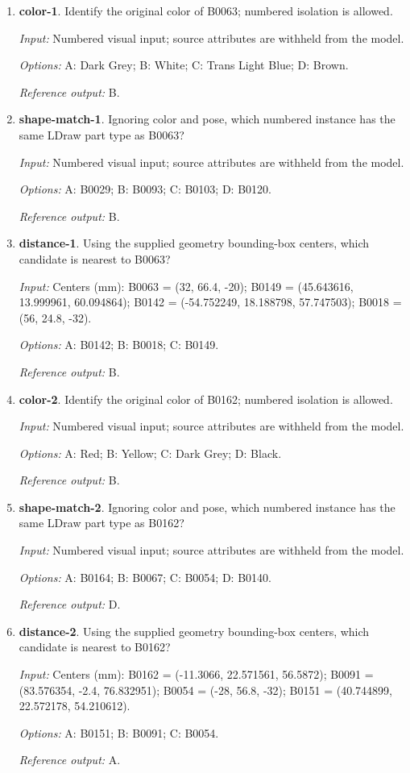 \begin{enumerate}
\item \textbf{color-1}. Identify the original color of B0063; numbered isolation is allowed.\par {\small \textit{Input:} Numbered visual input; source attributes are withheld from the model. \par\textit{Options:} A: Dark Grey; B: White; C: Trans Light Blue; D: Brown. \par\textit{Reference output:} B.}
\item \textbf{shape-match-1}. Ignoring color and pose, which numbered instance has the same LDraw part type as B0063?\par {\small \textit{Input:} Numbered visual input; source attributes are withheld from the model. \par\textit{Options:} A: B0029; B: B0093; C: B0103; D: B0120. \par\textit{Reference output:} B.}
\item \textbf{distance-1}. Using the supplied geometry bounding-box centers, which candidate is nearest to B0063?\par {\small \textit{Input:} Centers (mm): B0063 = (32, 66.4, -20); B0149 = (45.643616, 13.999961, 60.094864); B0142 = (-54.752249, 18.188798, 57.747503); B0018 = (56, 24.8, -32). \par\textit{Options:} A: B0142; B: B0018; C: B0149. \par\textit{Reference output:} B.}
\item \textbf{color-2}. Identify the original color of B0162; numbered isolation is allowed.\par {\small \textit{Input:} Numbered visual input; source attributes are withheld from the model. \par\textit{Options:} A: Red; B: Yellow; C: Dark Grey; D: Black. \par\textit{Reference output:} B.}
\item \textbf{shape-match-2}. Ignoring color and pose, which numbered instance has the same LDraw part type as B0162?\par {\small \textit{Input:} Numbered visual input; source attributes are withheld from the model. \par\textit{Options:} A: B0164; B: B0067; C: B0054; D: B0140. \par\textit{Reference output:} D.}
\item \textbf{distance-2}. Using the supplied geometry bounding-box centers, which candidate is nearest to B0162?\par {\small \textit{Input:} Centers (mm): B0162 = (-11.3066, 22.571561, 56.5872); B0091 = (83.576354, -2.4, 76.832951); B0054 = (-28, 56.8, -32); B0151 = (40.744899, 22.572178, 54.210612). \par\textit{Options:} A: B0151; B: B0091; C: B0054. \par\textit{Reference output:} A.}

\end{enumerate}
